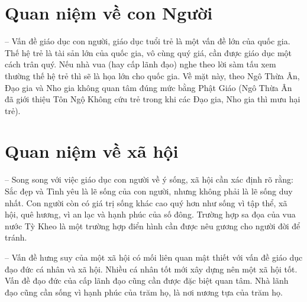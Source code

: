 \section{Quan niệm về con Người} %
\label{sec:78_79_con_nguoi}

-- Vấn đề giáo dục con người, giáo dục tuổi trẻ là một vấn đề lớn của quốc gia. Thế hệ trẻ là tài sản lớn của quốc gia, vô cùng quý giá, cần được giáo dục một cách trân quý. Nếu nhà vua (hay cấp lãnh đạo) nghe theo lời sàm tấu xem thường thế hệ trẻ thì sẽ là họa lớn cho quốc gia. Về mặt này, theo Ngô Thừa Ân, Đạo gia và Nho gia không quan tâm đúng mức bằng Phật Giáo (Ngô Thừa Ân đã giới thiệu Tôn Ngộ Không cứu trẻ trong khi các Đạo gia, Nho gia thì mưu hại trẻ).

\section{Quan niệm về xã hội} %
\label{sec:78_79_xa_hoi}

-- Song song với việc giáo dục con người về ý sống, xã hội cần xác định rõ rằng: Sắc đẹp và Tình yêu là lẽ sống của con người, nhưng không phải là lẽ sống duy nhất. Con người còn có giá trị sống khác cao quý hơn như sống vì tập thể, xã hội, quê hương, vì an lạc và hạnh phúc của số đông. Trường hợp sa đọa của vua nước Tỳ Kheo là một trường hợp điển hình cần được nêu gương cho người đời để tránh.

-- Vấn đề hưng suy của một xã hội có mối liên quan mật thiết với vấn đề giáo dục đạo đức cá nhân và xã hội. Nhiều cá nhân tốt mới xây dựng nên một xã hội tốt. Vấn đề đạo đức của cấp lãnh đạo cũng cần được đặc biệt quan tâm. Nhà lãnh đạo cũng cần sống vì hạnh phúc của trăm họ, là nơi nương tựa của trăm họ.
